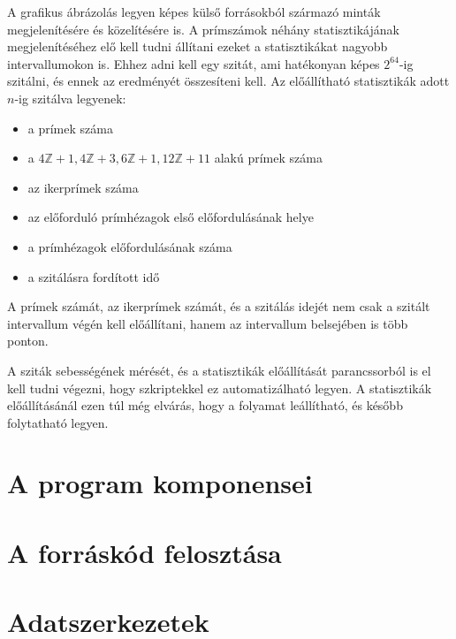 \documentclass[12pt]{report}
\begin{document}
A grafikus ábrázolás legyen képes külső forrásokból származó minták megjelenítésére
és közelítésére is. A prímszámok néhány statisztikájának megjelenítéséhez elő kell tudni
állítani ezeket a statisztikákat nagyobb intervallumokon is.
Ehhez adni kell egy szitát, ami hatékonyan képes $2^{64}$-ig szitálni,
és ennek az eredményét összesíteni kell. Az előállítható statisztikák
adott $n$-ig szitálva legyenek:
\begin{itemize}
\item a prímek száma
\item a $4\mathbb{Z}+1, 4\mathbb{Z}+3, 6\mathbb{Z}+1, 12\mathbb{Z}+11$
	alakú prímek száma
\item az ikerprímek száma
\item az előforduló prímhézagok első előfordulásának helye
\item a prímhézagok előfordulásának száma
\item a szitálásra fordított idő
\end{itemize}

A prímek számát, az ikerprímek számát, és a szitálás idejét
nem csak a szitált intervallum végén
kell előállítani, hanem az intervallum belsejében is több ponton.

A sziták sebességének mérését, és a statisztikák előállítását
parancssorból is el kell tudni végezni, hogy szkriptekkel ez automatizálható legyen.
A statisztikák előállításánál ezen túl még elvárás, hogy a folyamat leállítható,
és később folytatható legyen.

\section{A program komponensei}

\section{A forráskód felosztása}

\section{Adatszerkezetek}
\end{document}
